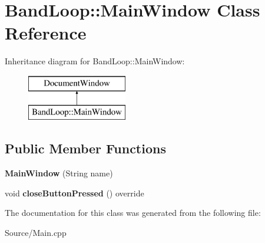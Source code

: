 \hypertarget{class_band_loop_1_1_main_window}{}\section{Band\+Loop\+::Main\+Window Class Reference}
\label{class_band_loop_1_1_main_window}
Inheritance diagram for Band\+Loop\+::Main\+Window\+:\begin{figure}[H]
\begin{center}
\leavevmode
\includegraphics[height=2.000000cm]{class_band_loop_1_1_main_window}
\end{center}
\end{figure}
\subsection*{Public Member Functions}
\begin{DoxyCompactItemize}
\item 
\mbox{\label{class_band_loop_1_1_main_window_aecbb2e651c6bb37ed1ed023cffe5e13d}} 
{\bfseries Main\+Window} (String name)
\item 
\mbox{\label{class_band_loop_1_1_main_window_a6a89ba83bbb4734ec5ef1a9ee04ff620}} 
void {\bfseries close\+Button\+Pressed} () override
\end{DoxyCompactItemize}


The documentation for this class was generated from the following file\+:\begin{DoxyCompactItemize}
\item 
Source/Main.\+cpp\end{DoxyCompactItemize}
